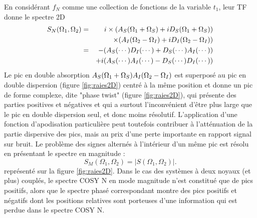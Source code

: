 En considérant $f_N$ comme une collection de fonctions de la variable $t_1$,
leur TF donne le spectre 2D
\begin{eqnarray}
S_N(\Omega_1, \Omega_2) & = & i \times (A_S(\Omega_1 + \Omega_S) + i D_S(\Omega_1 + \Omega_S))
\nonumber\\
& & \times (A_I(\Omega_2 - \Omega_I) + i D_I(\Omega_2 - \Omega_I)) \\
& = & -(A_S(\cdots) D_I(\cdots) + D_S(\cdots) A_I(\cdots))
\nonumber \\
& & + i (A_S(\cdots) A_I(\cdots) - D_S(\cdots) D_I(\cdots))
\end{eqnarray}
Le pic en double absorption $A_S(\Omega_1 + \Omega_S) A_I(\Omega_2 - \Omega_I)$
est superposé au pic en double dispersion (figure \ref{fig:raies2D})
centré à la même position et donne un
pic de forme complexe, dite "phase twist" (figure \ref{fig:raies2D}),
qui présente des parties positives et négatives
et qui a surtout l'inconvénient d'être plus large que le pic en double dispersion
seul, et donc moins résolutif.
L'application d'une fonction d'apodisation particulière peut toutefois contribuer
à l'atténuation de la partie dispersive des pics, mais au prix d'une perte importante
en rapport signal sur bruit.
Le problème des signes alternés à l'intérieur d'un même pic est
résolu en présentant le spectre en magnitude :
\begin{equation}
S_M(\Omega_1, \Omega_2) = | S(\Omega_1, \Omega_2) |.
\end{equation}
représenté sur la figure \ref{fig:raies2D}.
Dans le cas des systèmes à deux noyaux (et plus) couplés, le spectre
COSY N en mode magnitude n'est constitué que de pics positifs, alors que le spectre
phasé correspondant montre des pics positifs et négatifs
dont les positions relatives sont porteuses d'une information
qui est perdue dans le spectre COSY N.

